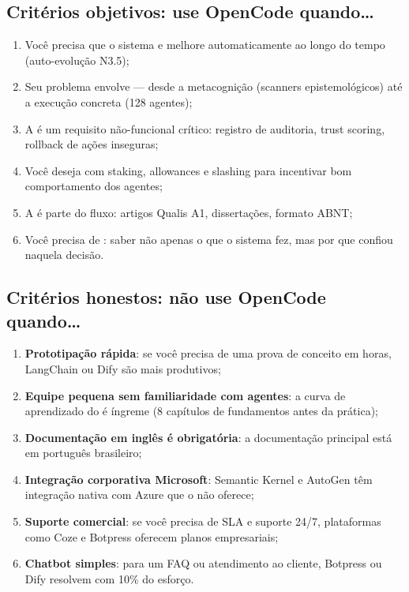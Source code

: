 \subsection{Critérios objetivos: use OpenCode quando\ldots}

\begin{enumerate}
    \item Você precisa que o sistema  e melhore automaticamente ao longo do tempo (auto-evolução N3.5);
    \item Seu problema envolve 
          --- desde a metacognição (scanners epistemológicos) até a
          execução concreta (128 agentes);
    \item A  é um requisito não-funcional crítico:
          registro de auditoria, trust scoring, rollback de ações
          inseguras;
    \item Você deseja  com staking,
          allowances e slashing para incentivar bom comportamento dos
          agentes;
    \item A  é parte do fluxo: artigos
          Qualis A1, dissertações, formato ABNT;
    \item Você precisa de :
          saber não apenas o que o sistema fez, mas por que confiou
          naquela decisão.
\end{enumerate}

\subsection{Critérios honestos: não use OpenCode quando\ldots}

\begin{enumerate}
    \item \textbf{Prototipação rápida}: se você precisa de uma prova de
          conceito em horas, LangChain ou Dify são mais produtivos;
    \item \textbf{Equipe pequena sem familiaridade com agentes}: a curva
          de aprendizado do \opencodeeco{} é íngreme (8 capítulos de
          fundamentos antes da prática);
    \item \textbf{Documentação em inglês é obrigatória}: a documentação
          principal está em português brasileiro;
    \item \textbf{Integração corporativa Microsoft}: Semantic Kernel e
          AutoGen têm integração nativa com Azure que o \opencodeeco{}
          não oferece;
    \item \textbf{Suporte comercial}: se você precisa de SLA e suporte
          24/7, plataformas como Coze e Botpress oferecem planos
          empresariais;
    \item \textbf{Chatbot simples}: para um FAQ ou atendimento ao
          cliente, Botpress ou Dify resolvem com 10\% do esforço.
\end{enumerate}

